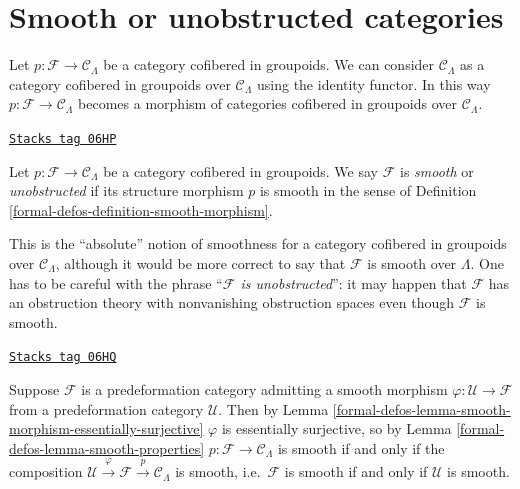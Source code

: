 \section{Smooth or unobstructed categories}
\label{formal-defos-section-smooth}
Let $p : \mathcal{F} \to \mathcal{C}_\Lambda$ be a category cofibered in
groupoids. We can consider $\mathcal{C}_\Lambda$ as a category
cofibered in groupoids over $\mathcal{C}_\Lambda$ using the identity
functor. In this way
$p : \mathcal{F} \longrightarrow \mathcal{C}_\Lambda$
becomes
a morphism of categories cofibered in groupoids over $\mathcal{C}_\Lambda$.

\begin{definition}
\label{formal-defos-definition-cofibered-groupoid-projection-smooth}
\href{https://stacks.math.columbia.edu/tag/06HP}{\texttt{Stacks tag 06HP}}

Let $p : \mathcal{F} \to \mathcal{C}_\Lambda$ be a category cofibered in
groupoids. We say $\mathcal{F}$ is {\it smooth} or {\it unobstructed}
if its structure morphism $p$ is smooth
in the sense of Definition \ref{formal-defos-definition-smooth-morphism}.
\end{definition}

This is the ``absolute'' notion of smoothness for a
category cofibered in groupoids over $\mathcal{C}_\Lambda$, although
it would be more correct to say that $\mathcal{F}$ is smooth over $\Lambda$.
One has to be careful with the phrase ``{\it $\mathcal{F}$ is unobstructed}'':
it may happen that
$\mathcal{F}$ has an obstruction theory with nonvanishing obstruction spaces
even though $\mathcal{F}$ is smooth.

\begin{remark}
\label{formal-defos-remark-smooth-on-top}
\href{https://stacks.math.columbia.edu/tag/06HQ}{\texttt{Stacks tag 06HQ}}

Suppose $\mathcal{F}$ is a predeformation category admitting a smooth morphism
$\varphi : \mathcal U \to \mathcal{F}$ from a predeformation category
$\mathcal{U}$.  Then by
Lemma \ref{formal-defos-lemma-smooth-morphism-essentially-surjective}
$\varphi$ is essentially surjective, so by
Lemma \ref{formal-defos-lemma-smooth-properties}
$p: \mathcal{F} \to \mathcal{C}_\Lambda$ is smooth if and only if the
composition $\mathcal U \xrightarrow{\varphi} \mathcal{F} \xrightarrow{p}
\mathcal{C}_\Lambda$ is smooth, i.e.\ $\mathcal{F}$ is smooth if and only if
$\mathcal{U}$ is smooth.
\end{remark}

